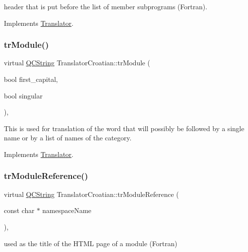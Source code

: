header that is put before the list of member subprograms (Fortran). 

Implements \mbox{\hyperlink{class_translator}{Translator}}.

\mbox{\label{class_translator_croatian_ad68309492bd413275f9056ff5f2ef5aa}} 
\subsubsection{\texorpdfstring{trModule()}{trModule()}}
{\footnotesize\ttfamily virtual \mbox{\hyperlink{class_q_c_string}{Q\+C\+String}} Translator\+Croatian\+::tr\+Module (\begin{DoxyParamCaption}\item[{bool}]{first\+\_\+capital,  }\item[{bool}]{singular }\end{DoxyParamCaption})\hspace{0.3cm}{\ttfamily [inline]}, {\ttfamily [virtual]}}

This is used for translation of the word that will possibly be followed by a single name or by a list of names of the category. 

Implements \mbox{\hyperlink{class_translator}{Translator}}.

\mbox{\label{class_translator_croatian_abb14abc827157cd52d6e34777608c329}} 
\subsubsection{\texorpdfstring{trModuleReference()}{trModuleReference()}}
{\footnotesize\ttfamily virtual \mbox{\hyperlink{class_q_c_string}{Q\+C\+String}} Translator\+Croatian\+::tr\+Module\+Reference (\begin{DoxyParamCaption}\item[{const char $\ast$}]{namespace\+Name }\end{DoxyParamCaption})\hspace{0.3cm}{\ttfamily [inline]}, {\ttfamily [virtual]}}

used as the title of the H\+T\+ML page of a module (Fortran) 

